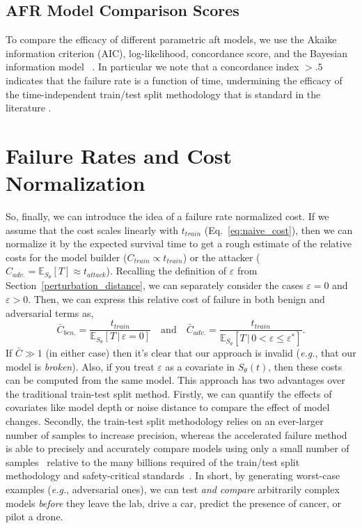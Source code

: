\subsection{AFR Model Comparison Scores}
\label{metrics}

To compare the efficacy of different parametric aft models, we use the Akaike information criterion (AIC), log-likelihood, concordance score, and the Bayesian information model ~\citep{stoica2004model,taddy2019business}. In particular we note that a concordance index $> .5$ indicates that the failure rate is a function of time, undermining the efficacy of the time-independent train/test split methodology that is standard in the literature \cite{concordance}.





\section{Failure Rates and Cost Normalization}


\label{cost_normalization}


So, finally, we can introduce the idea of a failure rate normalized cost. If we assume that the cost scales linearly with $t_{train}$ (Eq.~\ref{eq:naive_cost}), then we can normalize it by the expected survival time to get a rough estimate of the relative costs for the model builder ($C_{train} \propto t_{train}$) or the attacker ($C_{adv.} = \mathbb{E}_{S_\theta}[T] \approx t_{attack}$). Recalling the definition of $\varepsilon$ from Section~\ref{perturbation_distance}, we can separately consider the cases $\varepsilon=0$ and $\varepsilon > 0$. Then, we can express this relative cost of failure in both benign and adversarial terms as,
\begin{equation}
    \bar{C}_{ben.} = \frac{t_{train}}{\mathbb{E}_{S_\theta}[T \,|\, \varepsilon = 0] }
    \text{~~~and~~~}
    \bar{C}_{adv.} = \frac{t_{train}}{\mathbb{E}_{S_\theta}[T \,|\, 0 < \varepsilon \leq \varepsilon^*]}.
    \label{eq:cost}
\end{equation}
If $\bar{C} \gg 1$ (in either case) then it's clear that our approach is invalid (\textit{e.g.}, that our model is \textit{broken}). Also, if you treat $\varepsilon$ as a covariate in ${S_\theta}(t)$, then these costs can be computed from the same model. 
This approach has two advantages over the traditional train-test split method. Firstly, we can quantify the effects of covariates like model depth or noise distance to compare the effect of model changes. Secondly, the train-test split methodology relies on an ever-larger number of samples to increase precision, whereas the accelerated failure method is able to precisely and accurately compare models using only a small number of samples~\cite{schmoor2000sample,lachin1981introduction} relative to the many billions required of the train/test split methodology and safety-critical standards~\cite{iso26262,IEC61508,IEC62034,meyers}.
In short, by generating worst-case examples (\textit{e.g.}, adversarial ones), we can test \textit{and compare} arbitrarily complex models \textit{before} they leave the lab, drive a car, predict the presence of cancer, or pilot a drone. 